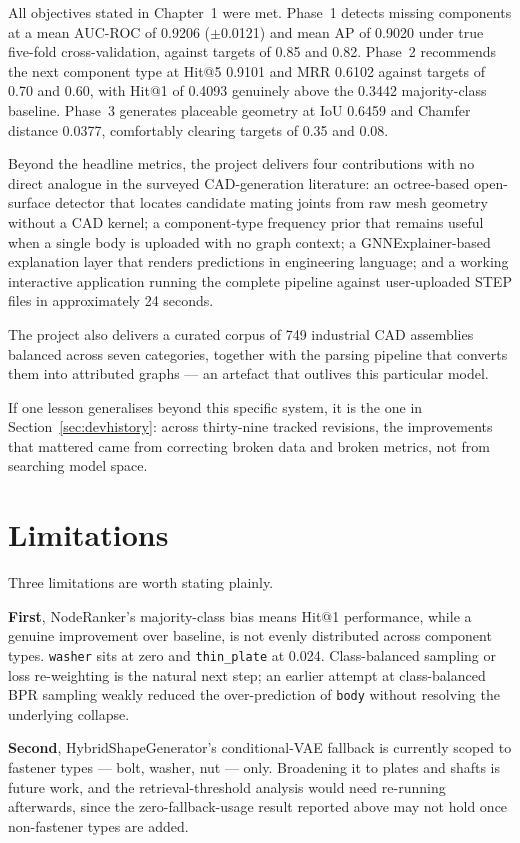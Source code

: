 \documentclass[12pt,oneside,a4paper]{report}
\begin{document}
All objectives stated in Chapter~1 were met. Phase~1 detects missing
components at a mean AUC-ROC of 0.9206 ($\pm$0.0121) and mean AP of 0.9020
under true five-fold cross-validation, against targets of 0.85 and 0.82.
Phase~2 recommends the next component type at Hit@5 0.9101 and MRR 0.6102
against targets of 0.70 and 0.60, with Hit@1 of 0.4093 genuinely above the
0.3442 majority-class baseline. Phase~3 generates placeable geometry at IoU
0.6459 and Chamfer distance 0.0377, comfortably clearing targets of 0.35 and
0.08.

Beyond the headline metrics, the project delivers four contributions with no
direct analogue in the surveyed CAD-generation literature: an octree-based
open-surface detector that locates candidate mating joints from raw mesh
geometry without a CAD kernel; a component-type frequency prior that remains
useful when a single body is uploaded with no graph context; a
GNNExplainer-based explanation layer that renders predictions in engineering
language; and a working interactive application running the complete pipeline
against user-uploaded STEP files in approximately 24 seconds.

The project also delivers a curated corpus of 749 industrial CAD assemblies
balanced across seven categories, together with the parsing pipeline that
converts them into attributed graphs --- an artefact that outlives this
particular model.

If one lesson generalises beyond this specific system, it is the one in
Section~\ref{sec:devhistory}: across thirty-nine tracked revisions, the
improvements that mattered came from correcting broken data and broken
metrics, not from searching model space.

\section{Limitations}
\label{sec:limitations}

Three limitations are worth stating plainly.

\textbf{First}, NodeRanker's majority-class bias means Hit@1 performance,
while a genuine improvement over baseline, is not evenly distributed across
component types. \texttt{washer} sits at zero and \texttt{thin\_plate} at
0.024. Class-balanced sampling or loss re-weighting is the natural next step;
an earlier attempt at class-balanced BPR sampling weakly reduced the
over-prediction of \texttt{body} without resolving the underlying collapse.

\textbf{Second}, HybridShapeGenerator's conditional-VAE fallback is currently
scoped to fastener types --- bolt, washer, nut --- only. Broadening it to
plates and shafts is future work, and the retrieval-threshold analysis would
need re-running afterwards, since the zero-fallback-usage result reported
above may not hold once non-fastener types are added.
\end{document}
